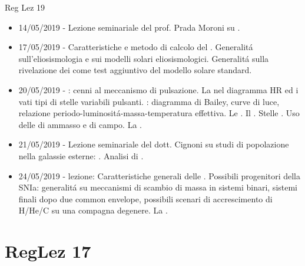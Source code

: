 \begin{frame}[allowframebreaks]{Reg Lez 19}
\begin{itemize}
\item 14/05/2019 - Lezione seminariale del prof. Prada Moroni su .
\item 17/05/2019 - Caratteristiche e metodo di calcolo del . Generalit\'a sull'eliosismologia e sui modelli solari eliosismologici. Generalit\'a sulla rivelazione dei  come test aggiuntivo del modello solare standard.
\item 20/05/2019 - : cenni al meccanismo di pulsazione. La  nel diagramma HR ed i vati tipi di stelle variabili pulsanti. : diagramma di Bailey, curve di luce, relazione periodo-luminosit\'a-massa-temperatura effettiva. Le . Il . Stelle . Uso delle  di ammasso e di campo. La .
\item 21/05/2019 - Lezione seminariale del dott. Cignoni su studi di popolazione nella galassie esterne: . Analisi di .
\item 24/05/2019 - lezione: Caratteristiche generali delle . Possibili progenitori della SNIa: generalit\'a su meccanismi di scambio di massa in sistemi binari, sistemi finali dopo due common envelope, possibili scenari di accrescimento di H/He/C su una compagna degenere. La .
\end{itemize}
\end{frame}

\section{RegLez 17}


